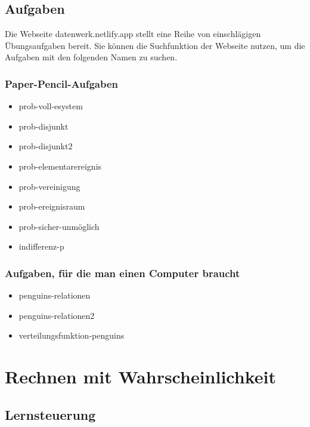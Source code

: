 \documentclass[
  ngerman,
  letterpaper,
  twoside,
  open=any]{scrbook}
\providecommand{\tightlist}{%
  \setlength{\itemsep}{0pt}\setlength{\parskip}{0pt}}\usepackage{longtable,booktabs,array}
\theoremstyle{definition}
\theoremstyle{plain}
\theoremstyle{definition}
\theoremstyle{definition}
\theoremstyle{definition}
\theoremstyle{definition}
\theoremstyle{remark}
\begin{document}
\section{Aufgaben}\label{aufgaben-2}

Die Webseite datenwerk.netlify.app stellt eine Reihe von einschlägigen
Übungsaufgaben bereit. Sie können die Suchfunktion der Webseite nutzen,
um die Aufgaben mit den folgenden Namen zu suchen.

\subsection{Paper-Pencil-Aufgaben}\label{paper-pencil-aufgaben-1}

\begin{itemize}
\tightlist
\item
  prob-voll-esystem
\item
  prob-disjunkt
\item
  prob-disjunkt2
\item
  prob-elementarereignis
\item
  prob-vereinigung
\item
  prob-ereignisraum
\item
  prob-sicher-unmöglich
\item
  indifferenz-p
\end{itemize}

\subsection{Aufgaben, für die man einen Computer
braucht}\label{aufgaben-fuxfcr-die-man-einen-computer-braucht-1}

\begin{itemize}
\tightlist
\item
  penguins-relationen
\item
  penguins-relationen2
\item
  verteilungsfunktion-penguins
\end{itemize}

\chapter{Rechnen mit
Wahrscheinlichkeit}\label{rechnen-mit-wahrscheinlichkeit}

\section{Lernsteuerung}\label{lernsteuerung-3}
\end{document}
